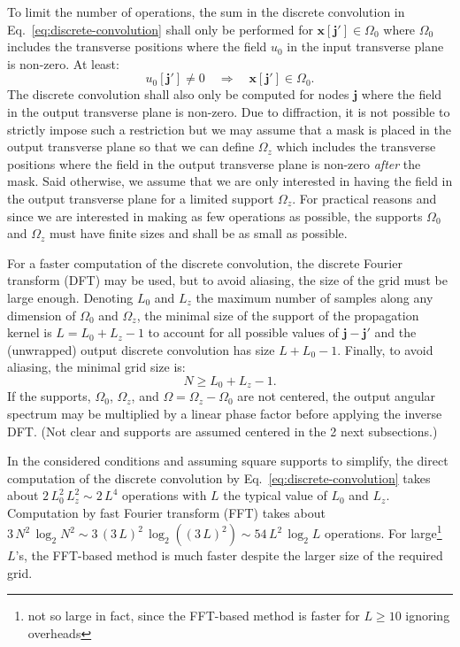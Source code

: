 \documentclass[a4paper]{article}
\newcommand{\oops}[1]{{\color{purple}#1}}
\newcommand{\V}[1]{\boldsymbol{#1}}
\newcommand*{\Set}[1]{\mathbb{#1}}
\begin{document}
To limit the number of operations, the sum in the discrete convolution in
Eq.~\eqref{eq:discrete-convolution} shall only be performed for
$\V{x}[\V{j}'] \in Ω_{0}$ where $Ω_{0}$ includes the transverse positions where
the field $u_{0}$ in the input transverse plane is non-zero. At least:
\begin{equation}
  \label{eq:input-field-support}
  u_{0}[\V{j}']
  \not= 0
  \quad\Longrightarrow\quad
  \V{x}[\V{j}'] \in Ω_{0}.
\end{equation}
The discrete convolution shall also only be computed for nodes $\V{j}$ where
the field in the output transverse plane is non-zero. Due to diffraction, it is
not possible to strictly impose such a restriction but we may assume that a
mask is placed in the output transverse plane so that we can define $Ω_{z}$
which includes the transverse positions where the field in the output
transverse plane is non-zero \emph{after} the mask. Said otherwise, we assume
that we are only interested in having the field in the output transverse plane
for a limited support $Ω_{z}$. For practical reasons and since we are
interested in making as few operations as possible, the supports $Ω_{0}$ and
$Ω_{z}$ must have finite sizes and shall be as small as possible.

For a faster computation of the discrete convolution, the discrete Fourier
transform (DFT) may be used, but to avoid aliasing, the size of the grid must
be large enough. Denoting $L_{0}$ and $L_{z}$ the maximum number of samples
along any dimension of $Ω_{0}$ and $Ω_{z}$, the minimal size of the support of
the propagation kernel is $L = L_{0} + L_{z} - 1$ to account for all possible
values of $\V{j} - \V{j}'$ and the (unwrapped) output discrete convolution has
size $L + L_{0} - 1$. Finally, to avoid aliasing, the minimal grid size is:
\begin{equation}
  \label{eq:convolution-grid-size}
  N ≥ L_{0} + L_{z} - 1.
\end{equation}
If the supports, $Ω_{0}$, $Ω_{z}$, and $Ω = Ω_{z} - Ω_{0}$ are not centered,
the output angular spectrum may be multiplied by a linear phase factor before
applying the inverse DFT. \oops{(Not clear and supports are assumed centered in
  the 2 next subsections.)}

In the considered conditions and assuming square supports to simplify, the
direct computation of the discrete convolution by
Eq.~\eqref{eq:discrete-convolution} takes about
$2\,L_{0}^{2}\,L_{z}^{2} \sim 2\,L^{4}$ operations with $L$ the typical
value of $L_{0}$ and $L_{z}$. Computation by fast Fourier transform (FFT) takes
about $3\,N^{2}\,\log_{2}N^{2} \sim 3\,(3\,L)^{2}\,\log_{2}((3\,L)^{2}) \sim 54\,L^{2}\,\log_{2}L$
operations. For large\footnote{not so large in fact, since the FFT-based method
  is faster for $L ≥ 10$ ignoring overheads} $L$'s, the FFT-based method is
much faster despite the larger size of the required grid.
\end{document}
